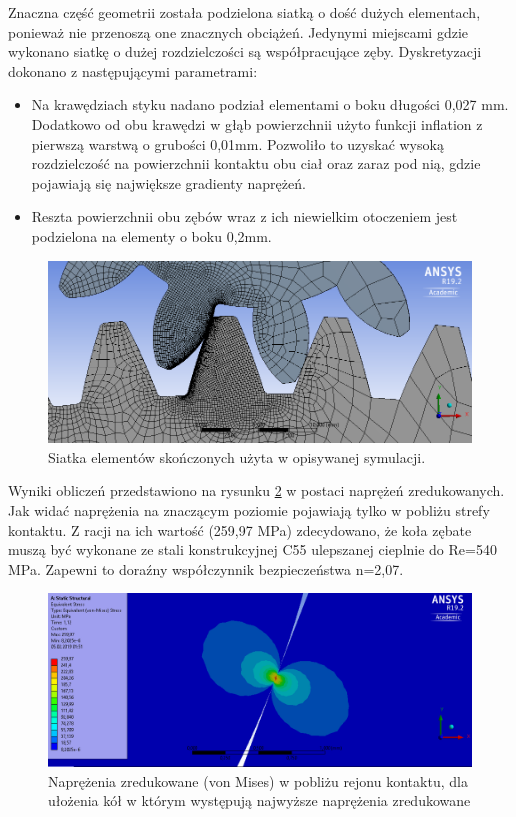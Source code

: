 Znaczna część geometrii została podzielona siatką o dość dużych elementach, ponieważ nie przenoszą one znacznych obciążeń.
Jedynymi miejscami gdzie wykonano siatkę o dużej rozdzielczości są współpracujące zęby.
Dyskretyzacji dokonano z następującymi parametrami:
\begin{itemize}
	\item Na krawędziach styku nadano podział elementami o boku długości 0,027 mm. 
	Dodatkowo od obu krawędzi w głąb powierzchnii użyto funkcji inflation z pierwszą warstwą o grubości 0,01mm.
	Pozwoliło to uzyskać wysoką rozdzielczość na powierzchnii kontaktu obu ciał oraz zaraz pod nią, gdzie pojawiają się największe gradienty naprężeń.
	\item Reszta powierzchnii obu zębów wraz z ich niewielkim otoczeniem jest podzielona na elementy o boku 0,2mm.
	
\end{itemize}

\begin{figure}[bh]
	\centering
	\includegraphics[width=0.9\linewidth]{Obliczenia/siatka_przekladnia}
	\caption{Siatka elementów skończonych użyta w opisywanej symulacji.} 
	\label{fig::mesh_przekladnia}
\end{figure}

Wyniki obliczeń przedstawiono na rysunku \ref{fig::stress_von_mises_przekladnia} w postaci naprężeń zredukowanych.
Jak widać naprężenia na znaczącym poziomie pojawiają tylko w pobliżu strefy kontaktu.
Z racji na ich wartość (259,97 MPa) zdecydowano, że koła zębate muszą być wykonane ze stali konstrukcyjnej C55 ulepszanej cieplnie do Re=540 MPa.
Zapewni to doraźny współczynnik bezpieczeństwa n=2,07.

\begin{figure}[th]
	\centering
	\includegraphics[width=0.9\linewidth]{Obliczenia/von_mises_stress_przekladnia}
	\caption{Naprężenia zredukowane (von Mises) w pobliżu rejonu kontaktu, dla ułożenia kół w którym występują najwyższe naprężenia zredukowane} 
	\label{fig::stress_von_mises_przekladnia}
\end{figure}

